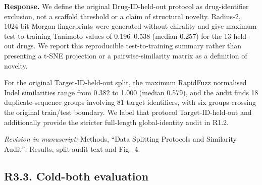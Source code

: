 \documentclass[11pt,a4paper]{article}
\newcommand{\response}{\noindent\textbf{Response.} }
\newcommand{\change}[1]{\par\smallskip\noindent\textit{Revision in manuscript:} #1\par\medskip}
\begin{document}
\response We define the original Drug-ID-held-out protocol as drug-identifier exclusion, not a scaffold
threshold or a claim of structural novelty. Radius-2, 1024-bit Morgan
fingerprints were generated without chirality and give maximum test-to-training Tanimoto values of 0.196--0.538
(median 0.257) for the 13 held-out drugs. We report this reproducible
test-to-training summary rather than presenting a t-SNE projection or a
pairwise-similarity matrix as a definition of novelty.

For the original Target-ID-held-out split, the maximum RapidFuzz normalised Indel similarities range
from 0.382 to 1.000 (median 0.579), and the audit finds 18 duplicate-sequence
groups involving 81 target identifiers, with six groups crossing the original
train/test boundary. We label that protocol Target-ID-held-out and additionally
provide the stricter full-length global-identity audit in R1.2.

\change{Methods, ``Data Splitting Protocols and Similarity Audit''; Results,
split-audit text and Fig.~4.}

\subsection*{R3.3. Cold-both evaluation}

\end{document}
